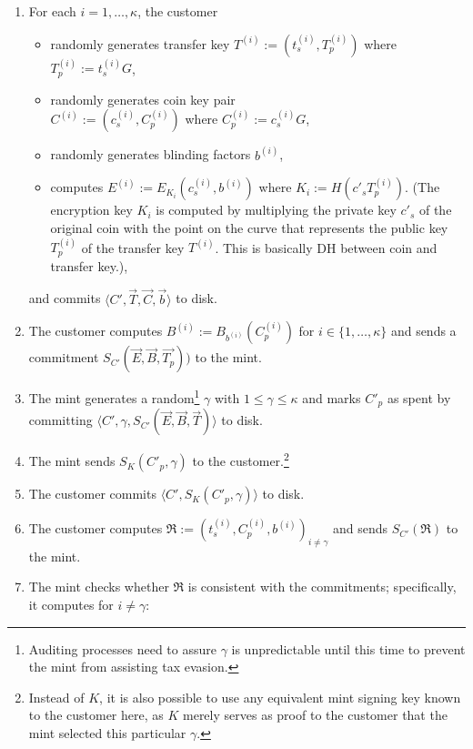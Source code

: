 \documentclass{llncs}
\begin{document}
\begin{enumerate}
  \item For each $i = 1,\ldots,\kappa$, the customer
    \begin{itemize}
      \item randomly generates transfer key $T^{(i)} := \left(t^{(i)}_s,T^{(i)}_p\right)$ where $T^{(i)}_p := t^{(i)}_s G$,
      \item randomly generates coin key pair \\ $C^{(i)} := \left(c_s^{(i)}, C_p^{(i)}\right)$ where $C^{(i)}_p := c^{(i)}_s G$,
      \item randomly generates blinding factors $b^{(i)}$,
      \item computes $E^{(i)} := E_{K_i}\left(c_s^{(i)}, b^{(i)}\right)$ where $K_i := H(c'_s T_p^{(i)})$. (The encryption key $K_i$ is
            computed by multiplying the private key $c'_s$ of the original coin with the point on the curve
            that represents the public key $T^{(i)}_p$ of the transfer key $T^{(i)}$. This is basically DH between coin and transfer key.),
    \end{itemize}
    and commits $\langle C', \vec{T}, \vec{C}, \vec{b} \rangle$ to disk.
  \item The customer computes $B^{(i)} := B_{b^{(i)}}(C^{(i)}_p)$  for $i \in \{1,\ldots,\kappa\}$ and sends a commitment
    $S_{C'}(\vec{E}, \vec{B}, \vec{T_p}))$ to the mint.
  \item The mint generates a random\footnote{Auditing processes need to assure $\gamma$ is unpredictable until this time to 
    prevent the mint from assisting tax evasion.} $\gamma$ with $1 \le \gamma \le \kappa$ and
    marks $C'_p$ as spent by committing
    $\langle C', \gamma, S_{C'}(\vec{E}, \vec{B}, \vec{T}) \rangle$ to disk.
  \item The mint sends $S_K(C'_p, \gamma)$ to the customer.\footnote{Instead of $K$, it is also
    possible to use any equivalent mint signing key known to the customer here, as $K$ merely
    serves as proof to the customer that the mint selected this particular $\gamma$.}
  \item The customer commits $\langle C', S_K(C'_p, \gamma) \rangle$ to disk.
  \item The customer computes $\mathfrak{R} := \left(t_s^{(i)}, C_p^{(i)}, b^{(i)}\right)_{i \ne \gamma}$
        and sends $S_{C'}(\mathfrak{R})$ to the mint.
  \item \label{step:refresh-ccheck} The mint checks whether $\mathfrak{R}$ is consistent with the commitments;
    specifically, it computes for $i \not= \gamma$:


\end{enumerate}
\end{document}
